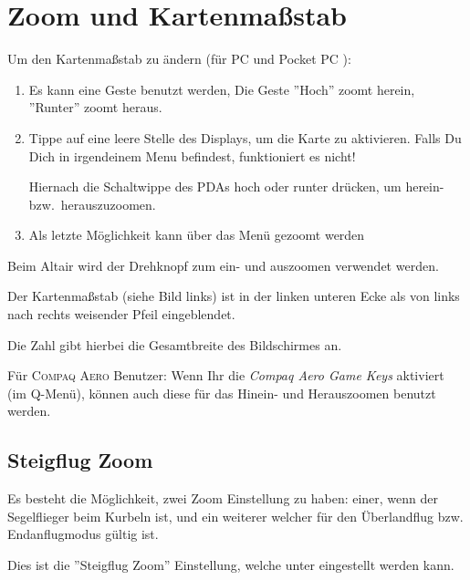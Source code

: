 \section{Zoom und Kartenmaßstab}\label{zoom}\label{kartenmasstab}
Um den Kartenmaßstab zu ändern  (für \textsf{PC}  und  \textsf{Pocket PC} ):
\begin{enumerate}
\item Es kann eine Geste benutzt werden, Die Geste 
     ''Hoch'' zoomt herein,  ''Runter'' zoomt heraus.
  \item Tippe auf eine leere Stelle des Displays, um die Karte zu aktivieren. Falls Du Dich in irgendeinem Menu befindest, funktioniert es nicht! 

  Hiernach die Schaltwippe des \textsf{PDA}s hoch oder runter drücken, um herein- bzw.\ herauszuzoomen.
  
     \item Als letzte Möglichkeit kann über das Menü gezoomt werden
\end{enumerate}

Beim Altair wird der Drehknopf zum ein- und auszoomen verwendet werden.

Der Kartenmaßstab (siehe Bild links)  ist in der linken unteren Ecke als von links nach rechts weisender Pfeil eingeblendet.  

Die Zahl gibt hierbei die Gesamtbreite des Bildschirmes an.

Für \textsc{Compaq Aero} Benutzer: Wenn Ihr die \textsl{Compaq Aero Game Keys} aktiviert (im Q-Menü), können auch diese für das Hinein- und Herauszoomen benutzt werden.

\subsection*{Steigflug Zoom}
Es besteht die Möglichkeit, zwei Zoom Einstellung zu haben: einer, wenn der Segelflieger beim Kurbeln ist, und ein weiterer welcher für den Überlandflug bzw. Endanflugmodus gültig ist.

Dies ist die ''Steigflug Zoom'' Einstellung, welche unter  eingestellt werden kann.

